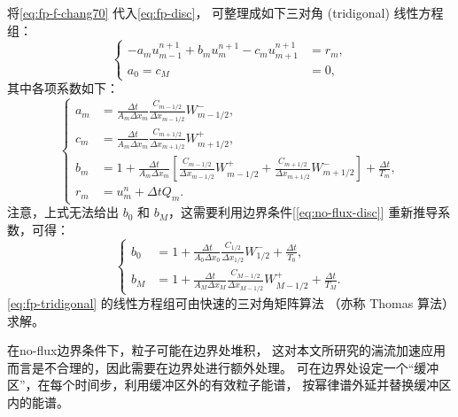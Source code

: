 将\autoref{eq:fp-f-chang70} 代入\autoref{eq:fp-disc}，
可整理成如下三对角 (tridigonal) 线性方程组：
\begin{equation}
  \label{eq:fp-tridigonal}
  \left\{
    \begin{aligned}
      -a_m u_{m-1}^{n+1} + b_m u_m^{n+1} - c_m u_{m+1}^{n+1} & = r_m, \\
      a_0 = c_M & = 0 ,
    \end{aligned}
  \right.
\end{equation}
其中各项系数如下：
\begin{equation}
  \label{eq:fp-coefs}
  \left\{
    \begin{aligned}
      a_m & = \frac{\Delta t}{A_m \Delta x_m}
        \frac{C_{m-1/2}}{\Delta x_{m-1/2}} W_{m-1/2}^{-} , \\
      c_m & = \frac{\Delta t}{A_m \Delta x_m}
        \frac{C_{m+1/2}}{\Delta x_{m+1/2}} W_{m+1/2}^{+} , \\
      b_m & = 1 + \frac{\Delta t}{A_m \Delta x_m}
        \left[ \frac{C_{m-1/2}}{\Delta x_{m-1/2}} W_{m-1/2}^{+}
        + \frac{C_{m+1/2}}{\Delta x_{m+1/2}} W_{m+1/2}^{-} \right]
        + \frac{\Delta t}{T_m} , \\
      r_m & = u_m^n + \Delta t Q_m .
    \end{aligned}
  \right.
\end{equation}
注意，上式无法给出 $b_0$ 和 $b_M$，这需要利用边界条件[\autoref{eq:no-flux-disc}]
重新推导系数，可得：
\begin{equation}
  \label{eq:fp-coefs-b}
  \left\{
    \begin{aligned}
      b_0 & = 1 + \frac{\Delta t}{A_0 \Delta x_0}
        \frac{C_{1/2}}{\Delta x_{1/2}} W_{1/2}^{-}
        + \frac{\Delta t}{T_0} , \\
      b_M & = 1 + \frac{\Delta t}{A_M \Delta x_M}
        \frac{C_{M-1/2}}{\Delta x_{M-1/2}} W_{M-1/2}^{+}
        + \frac{\Delta t}{T_M} .
    \end{aligned}
  \right.
\end{equation}
\autoref{eq:fp-tridigonal} 的线性方程组可由快速的三对角矩阵算法
（亦称 Thomas 算法）求解\cite{press1992}。

在\ac{no-flux}边界条件下，粒子可能在边界处堆积，
这对本文所研究的湍流加速应用而言是不合理的，因此需要在边界处进行额外处理。
可在边界处设定一个\enquote{缓冲区}，在每个时间步，利用缓冲区外的有效粒子能谱，
按幂律谱外延并替换缓冲区内的能谱\cite{borovsky1986,donnert2014}。


